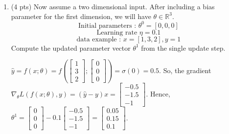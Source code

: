 \documentclass[a4paper]{article}
\theoremstyle{definition}
\newenvironment{soln}{
    \leavevmode\color{blue}\ignorespaces
}{}
\begin{document}
\begin{enumerate}
\begin{enumerate}
	\item (4 pts)
 Now assume a two dimensional input. After including a bias parameter for the first dimension, we will have $\theta\in\mathbb{R}^3$.
$$ \text{Initial parameters : }  \theta^{0}=[0, 0, 0]$$
$$ \text{Learning rate }\eta=0.1$$
$$ \text{data example : } x=[1, 3, 2], y=1$$
Compute the updated parameter vector $\theta^{1}$ from the single update step.
	
	\begin{soln}
    $\hat{y} = f(x; \theta) = f\left( \begin{bmatrix} 1 \\ 3 \\ 2 \end{bmatrix}; \begin{bmatrix} 0 \\ 0 \\ 0 \end{bmatrix} \right) = \sigma(0) = 0.5$. So, the gradient $\nabla_\theta L(f(x; \theta), y) = (\hat{y} - y) x = \begin{bmatrix} -0.5 \\ -1.5 \\ -1 \end{bmatrix}$. Hence, $\theta^1 = \begin{bmatrix} 0 \\ 0 \\ 0 \end{bmatrix} - 0.1 \begin{bmatrix} -0.5 \\ -1.5 \\ -1 \end{bmatrix} = \begin{bmatrix} 0.05 \\ 0.15 \\ 0.1 \end{bmatrix}$.
    \end{soln}
\end{enumerate}
\end{enumerate}
\end{document}
